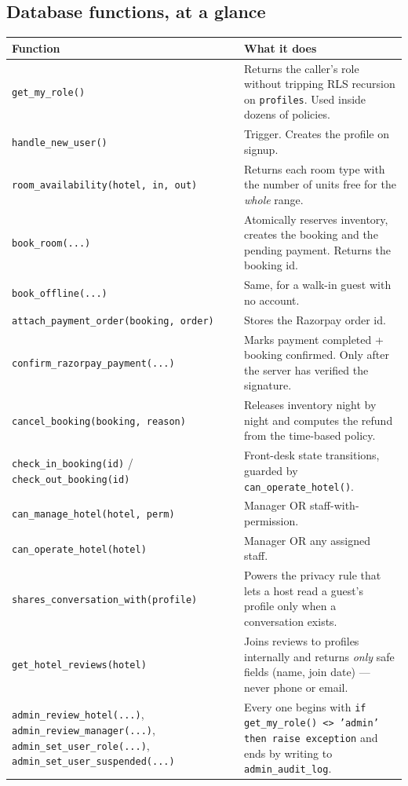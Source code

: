 \documentclass[11pt,a4paper]{article}
\begin{document}
\subsection{Database functions, at a glance}

\begin{longtable}{@{}p{5.2cm}p{9.6cm}@{}}
\toprule
\textbf{Function} & \textbf{What it does} \\
\midrule
\endhead
\texttt{get\_my\_role()} & Returns the caller's role without tripping RLS
recursion on \texttt{profiles}. Used inside dozens of policies. \\
\addlinespace
\texttt{handle\_new\_user()} & Trigger. Creates the profile on signup. \\
\addlinespace
\texttt{room\_availability(hotel, in, out)} & Returns each room type with the
number of units free for the \emph{whole} range. \\
\addlinespace
\texttt{book\_room(...)} & Atomically reserves inventory, creates the booking and
the pending payment. Returns the booking id. \\
\addlinespace
\texttt{book\_offline(...)} & Same, for a walk-in guest with no account. \\
\addlinespace
\texttt{attach\_payment\_order(booking, order)} & Stores the Razorpay order id. \\
\addlinespace
\texttt{confirm\_razorpay\_payment(...)} & Marks payment completed + booking
confirmed. Only after the server has verified the signature. \\
\addlinespace
\texttt{cancel\_booking(booking, reason)} & Releases inventory night by night and
computes the refund from the time-based policy. \\
\addlinespace
\texttt{check\_in\_booking(id)} / \texttt{check\_out\_booking(id)} & Front-desk
state transitions, guarded by \texttt{can\_operate\_hotel()}. \\
\addlinespace
\texttt{can\_manage\_hotel(hotel, perm)} & Manager OR staff-with-permission. \\
\addlinespace
\texttt{can\_operate\_hotel(hotel)} & Manager OR any assigned staff. \\
\addlinespace
\texttt{shares\_conversation\_with(profile)} & Powers the privacy rule that lets
a host read a guest's profile only when a conversation exists. \\
\addlinespace
\texttt{get\_hotel\_reviews(hotel)} & Joins reviews to profiles internally and
returns \emph{only} safe fields (name, join date) --- never phone or email. \\
\addlinespace
\texttt{admin\_review\_hotel(...)}, \texttt{admin\_review\_manager(...)},
\texttt{admin\_set\_user\_role(...)}, \texttt{admin\_set\_user\_suspended(...)}
& Every one begins with
\texttt{if get\_my\_role() <> 'admin' then raise exception} and ends by writing
to \texttt{admin\_audit\_log}. \\
\bottomrule
\end{longtable}
\end{document}

